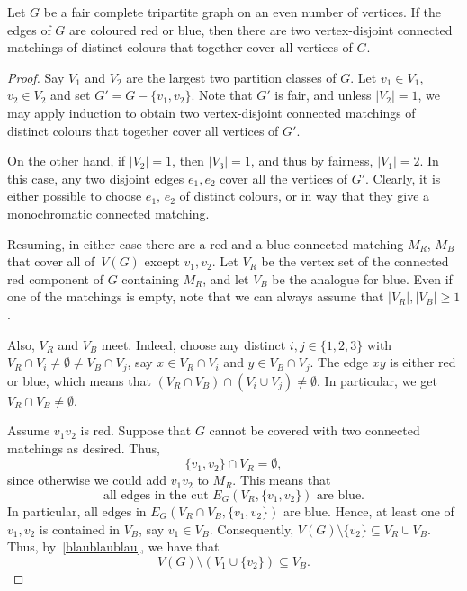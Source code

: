 \documentclass[a4paper,10pt]{article}
\begin{document}
\begin{lemma}\label{lem:conn-matchings-exact}
Let $G$ be a fair complete tripartite graph on an even number of vertices.
If the edges of $G$ are coloured red or blue, then there are two vertex-disjoint connected matchings of distinct colours that together cover all vertices of $G$.
\end{lemma}
\begin{proof}
Say $V_1$ and $V_2$ are the largest two partition classes of $G$.
Let $v_1 \in V_1$, $v_2 \in V_2$ and set $G' = G -\{v_1,v_2\}$.
Note that $G'$ is fair, and unless $|V_2|=1$, we may apply induction to obtain two vertex-disjoint connected matchings of distinct colours that together cover all vertices of $G'$. 

On the other hand, if $|V_2|=1$, then $|V_3| = 1$, and thus by fairness, $|V_1|=2$.
In this case, any two disjoint edges $e_1,e_2$ cover all the vertices of $G'$. Clearly, it is either possible to choose $e_1$, $e_2$ of distinct colours, or in way that they give a monochromatic connected matching.

Resuming, in either case there are a red and a blue connected matching $M_R$, $M_B$ that cover all of~$V(G)$ except $v_1,v_2$. Let $V_R$ be
 the vertex set of the connected red component of $G$ containing $M_R$, and let $V_B$ be the analogue for blue.
Even if one of the matchings is empty, note that we can always assume that  $|V_R|, |V_B|\geq 1$.

Also, $V_R$ and $V_B$ meet. Indeed,
choose any distinct $i,j \in \{1,2,3\}$ with $V_R \cap V_i\neq \emptyset\neq V_B \cap V_j $, say $x \in V_R \cap V_i$ and $y \in V_B \cap V_j$.
The edge $xy$ is either red or blue, which means that $(V_R \cap V_B)\cap (V_i\cup V_j) \neq \emptyset$. In particular, we get $V_R \cap V_B \neq \emptyset$.

Assume $v_1v_2$ is red.
Suppose that $G$ cannot be covered with two connected matchings as desired.
Thus, 
\begin{equation}\label{nichtinrot}
\{v_1,v_2\} \cap V_R = \emptyset,
\end{equation}
 since otherwise we could add $v_1v_2$ to $M_R$.
This means that 
\begin{equation}\label{blaublaublau}
\text{all edges in the cut $E_G(V_R,\{v_1,v_2\})$ are blue.}
\end{equation}
In particular, all edges in $E_G(V_R \cap V_B,\{v_1,v_2\})$ are blue.
Hence, at least one of $v_1,v_2$ is contained in $V_B$, say $v_1\in V_B$. 
Consequently, $V(G) \setminus \{v_2\} \subseteq V_R \cup V_B$.
Thus, by~\eqref{blaublaublau}, we have that 
\begin{equation}\label{allesblau}
V(G)\setminus (V_1\cup\{v_2\})\subseteq V_B.
\end{equation}


\end{proof}
\end{document}

